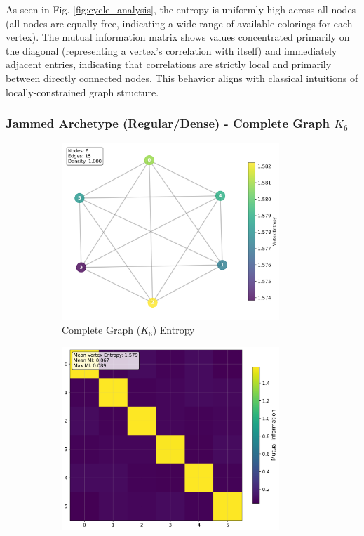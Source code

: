 \documentclass[12pt, letterpaper]{article}
\begin{document}
As seen in Fig. \ref{fig:cycle_analysis}, the entropy is uniformly high across all nodes (all nodes are equally free, indicating a wide range of available colorings for each vertex). The mutual information matrix shows values concentrated primarily on the diagonal (representing a vertex's correlation with itself) and immediately adjacent entries, indicating that correlations are strictly local and primarily between directly connected nodes. This behavior aligns with classical intuitions of locally-constrained graph structure.

\subsubsection{Jammed Archetype (Regular/Dense) - Complete Graph $K_6$}

\begin{figure}[H]
    \centering
    \begin{subfigure}[b]{0.48\textwidth}
        \includegraphics[width=0.9\textwidth]{images/Graph Visualizations/Jammed/Complete_vertex_entropy.png}
        \caption{Complete Graph ($K_6$) Entropy}
        \label{fig:complete_entropy}
    \end{subfigure}
    \hfill
    \begin{subfigure}[b]{0.48\textwidth}
        \includegraphics[width=0.9\textwidth]{images/Graph Visualizations/Jammed/Complete_MI_Matrix.png}

\end{subfigure}
\end{figure}
\end{document}
